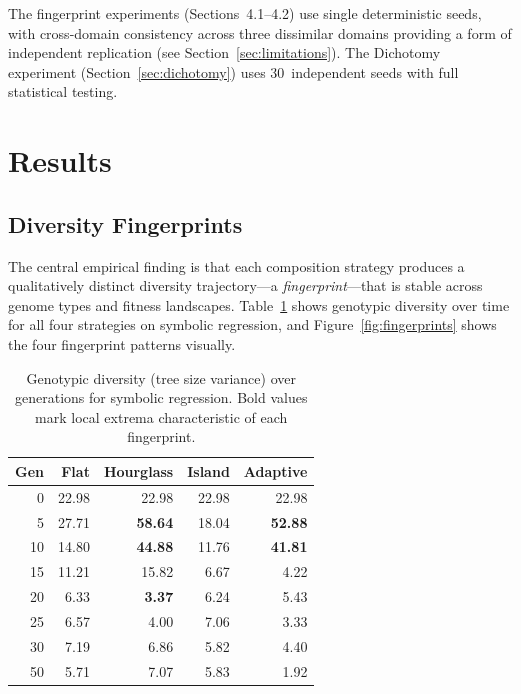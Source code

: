 \documentclass[sigconf]{acmart}
\begin{document}
The fingerprint experiments (Sections~4.1--4.2) use single deterministic seeds, with cross-domain consistency across three dissimilar domains providing a form of independent replication (see Section~\ref{sec:limitations}). The Dichotomy experiment (Section~\ref{sec:dichotomy}) uses 30~independent seeds with full statistical testing.


\section{Results}

\subsection{Diversity Fingerprints}

The central empirical finding is that each composition strategy produces a qualitatively distinct diversity trajectory---a \emph{fingerprint}---that is stable across genome types and fitness landscapes. Table~\ref{tab:sr-diversity} shows genotypic diversity over time for all four strategies on symbolic regression, and Figure~\ref{fig:fingerprints} shows the four fingerprint patterns visually.

\begin{table}[ht]
\centering
\caption{Genotypic diversity (tree size variance) over generations for symbolic regression. Bold values mark local extrema characteristic of each fingerprint.}
\label{tab:sr-diversity}
\begin{tabular}{@{}rrrrr@{}}
\toprule
\textbf{Gen} & \textbf{Flat} & \textbf{Hourglass} & \textbf{Island} & \textbf{Adaptive} \\
\midrule
0   & 22.98 & 22.98          & 22.98 & 22.98 \\
5   & 27.71 & \textbf{58.64} & 18.04 & \textbf{52.88} \\
10  & 14.80 & \textbf{44.88} & 11.76 & \textbf{41.81} \\
15  & 11.21 & 15.82          & 6.67  & 4.22 \\
20  & 6.33  & \textbf{3.37}  & 6.24  & 5.43 \\
25  & 6.57  & 4.00           & 7.06  & 3.33 \\
30  & 7.19  & 6.86           & 5.82  & 4.40 \\
50  & 5.71  & 7.07           & 5.83  & 1.92 \\
\bottomrule
\end{tabular}
\end{table}
\end{document}
